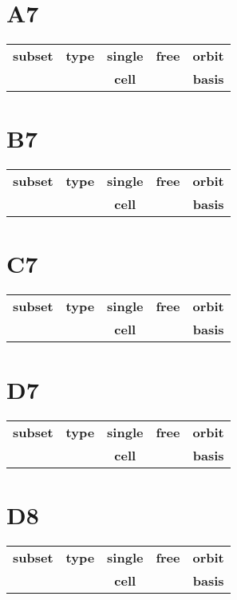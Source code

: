 \documentclass{article}
\newcommand{\resulttable}[1]{
  \section*{#1}
\begin{longtable}{llccc}
  \toprule
  \textbf{subset} & \textbf{type} & \textbf{single} & \textbf{free} & \textbf{orbit} \\
                  &               &   \textbf{cell}   &                & \textbf{basis} \\
  \midrule
  
  \bottomrule
\end{longtable}
}
\begin{document}
\resulttable{A7}\newpage
\resulttable{B7}\newpage
\resulttable{C7}\newpage
\resulttable{D7}\newpage
\resulttable{D8}
\end{document}
